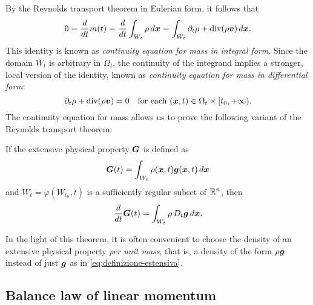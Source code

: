 By the Reynolds transport theorem in Eulerian form, it follows that
\begin{equation} \label{eq:continuita-forma-integrale}
0
= \frac{d}{dt} m(t)
= \frac{d}{dt} \int_{W_t} \rho \, d\bm{x}
= \int_{W_t} \partial_t \rho + \operatorname{div}(\rho \bm{v}) \, d\bm{x}.
\end{equation}
This identity is known as \emph{continuity equation for mass in integral form}.
Since the domain $W_t$ is arbitrary in $\Omega_t$, the continuity of the
integrand implies a stronger, local version of the identity, known as
\emph{continuity equation for mass in differential form}:
\begin{equation} \label{eq:continuita-forma-differenziale}
\partial_t \rho + \operatorname{div}(\rho \bm{v}) = 0
\quad \text{for each $(\bm{x},t) \in \Omega_t \times [t_0,+\infty)$.}
\end{equation}
The continuity equation for mass allows us to prove the following variant
of the Reynolds transport theorem:
\begin{teor} \label{teor:reynolds-per-unita-di-massa}
If the extensive physical property $\bm{G}$ is defined as
\[
\bm{G}(t) = \int_{W_t} \rho(\bm{x},t) \bm{g}(\bm{x},t) \, d\bm{x}
\]
and $W_t = \varphi(W_{t_0},t)$ is a sufficiently regular
subset of $\mathbb{R}^n$, then
\[
\frac{d}{dt} \bm{G}(t) = \int_{W_t} \rho \, D_t \bm{g} \, d\bm{x}.
\]
\end{teor}

\noindent In the light of this theorem, it is often convenient
to choose the density of an extensive physical property
\emph{per unit mass}, that is, a density of the form $\rho \:\! \bm{g}$
instead of just $\bm{g}$ as in \eqref{eq:definizione-estensiva}.

\subsection*{Balance law of linear momentum}

